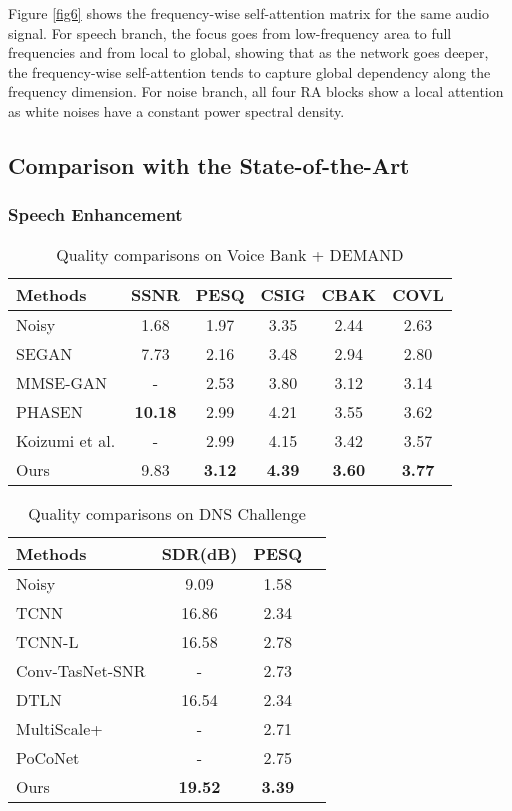\documentclass[letterpaper]{article} \usepackage{snnet}  \usepackage{times}  \usepackage{helvet} \usepackage{courier}  \usepackage[hyphens]{url}  \usepackage{graphicx} \urlstyle{rm} \def\UrlFont{\rm}  \usepackage{graphicx}  \usepackage{natbib}  \usepackage{caption} \usepackage{amsfonts}  \usepackage{amsmath}  \usepackage{multirow} \usepackage{tablefootnote}  \usepackage[switch]{lineno}
\begin{document}
Figure \ref{fig6} shows the frequency-wise self-attention matrix for the same audio signal. For speech branch, the focus goes from low-frequency area to full frequencies and from local to global, showing that as the network goes deeper, the frequency-wise self-attention tends to capture global dependency along the frequency dimension. For noise branch, all four RA blocks show a local attention as white noises have a constant power spectral density.

\subsection{Comparison with the State-of-the-Art}

\subsubsection{Speech Enhancement}
\begin{table}[t]
    \centering
    \small
    \begin{tabular}{lccccc}
        \hline
        \textbf{Methods} & \textbf{SSNR} & \textbf{PESQ} & \textbf{CSIG} & \textbf{CBAK} & \textbf{COVL}\\
        \hline
        Noisy & 1.68 & 1.97 & 3.35 & 2.44 & 2.63\\
        \hline
        SEGAN & 7.73 & 2.16 & 3.48 & 2.94 & 2.80\\
        MMSE-GAN & - & 2.53 & 3.80 & 3.12 & 3.14\\
        \hline
        PHASEN & \textbf{10.18} & 2.99 & 4.21 & 3.55 & 3.62\\
        \hline
        Koizumi et al. & - & 2.99 & 4.15 & 3.42 & 3.57\\
        \hline
        Ours & 9.83 & \textbf{3.12} & \textbf{4.39} & \textbf{3.60} & \textbf{3.77} \\
        \hline
    \end{tabular}
    \caption{Quality comparisons on Voice Bank + DEMAND}
    \label{table2}
\end{table}

\begin{table}[t]
    \centering
    \begin{tabular}{lccc}
        \hline
        \textbf{Methods} & \textbf{SDR(dB)} & \textbf{PESQ} \\
        \hline
        Noisy & 9.09 & 1.58 \\
        \hline
        TCNN & 16.86 & 2.34  \\
        TCNN-L & 16.58 & 2.78 \\
        \hline
        Conv-TasNet-SNR & - & 2.73 \\
        \hline
        DTLN & 16.54 & 2.34 \\
        \hline
        MultiScale+ & - & 2.71 \\
        \hline
        PoCoNet & - & 2.75 \\
        \hline
        Ours & \textbf{19.52} & \textbf{3.39} \\
        \hline
    \end{tabular}
    \caption{Quality comparisons on DNS Challenge}
    \label{table3}
\end{table}
\end{document}
